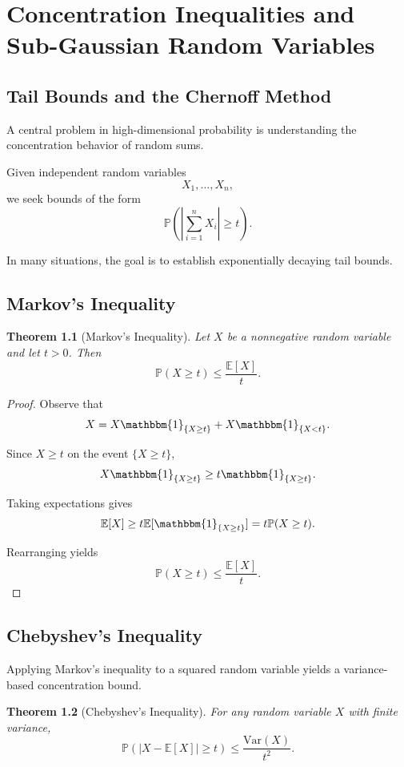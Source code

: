 \documentclass[12pt,oneside]{book}
\numberwithin{equation}{section}
\theoremstyle{definition}
\theoremstyle{plain}
\newtheorem{theorem}{Theorem}[section]
\theoremstyle{remark}
\newcommand{\E}{\mathbb{E}}
\newcommand{\Var}{\mathrm{Var}}
\newcommand{\Prob}{\mathbb{P}}
\newcommand{\ind}{\mathbbm{1}}
\begin{document}
\chapter{Concentration Inequalities and Sub-Gaussian Random Variables}

\section{Tail Bounds and the Chernoff Method}

A central problem in high-dimensional probability is understanding the concentration behavior of random sums.

Given independent random variables
\[
X_1,\dots,X_n,
\]
we seek bounds of the form
\[
\Prob\left(
\left|
\sum_{i=1}^n X_i
\right|
\geq t
\right).
\]

In many situations, the goal is to establish exponentially decaying tail bounds.

\section{Markov's Inequality}

\begin{theorem}[Markov's Inequality]
Let $X$ be a nonnegative random variable and let $t>0$. Then
\[
\Prob(X\geq t)
\leq
\frac{\E[X]}{t}.
\]
\end{theorem}

\begin{proof}
Observe that
\[
X
=
X\ind_{\{X\geq t\}}
+
X\ind_{\{X<t\}}.
\]

Since $X\geq t$ on the event $\{X\geq t\}$,
\[
X\ind_{\{X\geq t\}}
\geq
t\ind_{\{X\geq t\}}.
\]

Taking expectations gives
\[
\E[X]
\geq
t\E[\ind_{\{X\geq t\}}]
=
t\Prob(X\geq t).
\]

Rearranging yields
\[
\Prob(X\geq t)
\leq
\frac{\E[X]}{t}.
\]
\end{proof}

\section{Chebyshev's Inequality}

Applying Markov's inequality to a squared random variable yields a variance-based concentration bound.

\begin{theorem}[Chebyshev's Inequality]
For any random variable $X$ with finite variance,
\[
\Prob(|X-\E[X]|\geq t)
\leq
\frac{\Var(X)}{t^2}.
\]
\end{theorem}
\end{document}
